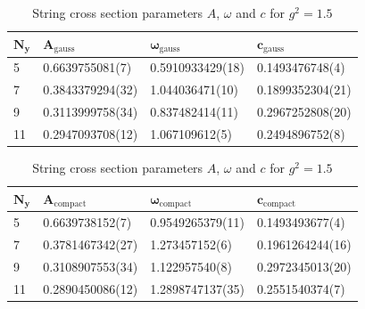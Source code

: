 \begin{table}[!hb]
\centering
\begin{tabular}{llll}
    $\mathbf{N_y}$ & $\mathbf{A_\mathrm{gauss}}$ & $\mathbf{\omega_\mathrm{gauss}}$ & $\mathbf{c_\mathrm{gauss}}$ \\ \hline
   5 & 0.6639755081(7) & 0.5910933429(18) & 0.1493476748(4) \\
   7 & 0.3843379294(32) & 1.044036471(10) & 0.1899352304(21) \\
   9 & 0.3113999758(34) & 0.837482414(11) & 0.2967252808(20) \\
   11 & 0.2947093708(12) & 1.067109612(5) & 0.2494896752(8) \\
\end{tabular}
\begin{tabular}{llll}
    $\mathbf{N_y}$ & $\mathbf{A_\mathrm{compact}}$ & $\mathbf{\omega_\mathrm{compact}}$ & $\mathbf{c_\mathrm{compact}}$ \\ \hline
   5 & 0.6639738152(7) & 0.9549265379(11) & 0.1493493677(4) \\
   7 & 0.3781467342(27) & 1.273457152(6) & 0.1961264244(16) \\
   9 & 0.3108907553(34) & 1.122957540(8) & 0.2972345013(20) \\
   11 & 0.2890450086(12) & 1.2898747137(35) & 0.2551540374(7) \\
\end{tabular}
\caption{String cross section parameters $A$, $\omega$ and $c$ for $g^2=1.5$}
\end{table}
